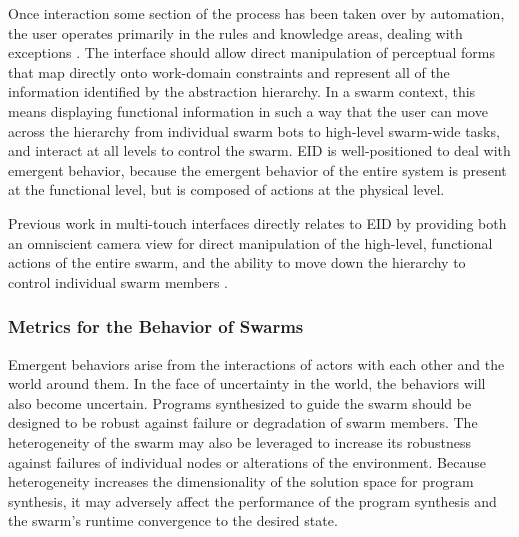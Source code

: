 \documentclass[]{article}
\begin{document}
Once interaction some section of the process has been taken over by automation, the user operates primarily in the rules and knowledge areas, dealing with exceptions \cite{vicente2002ecological}.
The interface should allow direct manipulation of perceptual forms that map directly onto work-domain constraints and represent all of the information identified by the abstraction hierarchy. 
In a swarm context, this means displaying functional information in such a way that the user can move across the hierarchy from individual swarm bots to high-level swarm-wide tasks, and interact at all levels to control the swarm. 
EID is well-positioned to deal with emergent behavior, because the emergent behavior of the entire system is present at the functional level, but is composed of actions at the physical level.  

Previous work in multi-touch interfaces directly relates to EID by providing both an omniscient camera view for direct manipulation of the high-level, functional actions of the entire swarm, and the ability to move down the hierarchy to control individual swarm members \cite{Micire:2009:ANG:1731903.1731912}.


\subsubsection{Metrics for the Behavior of Swarms}

Emergent behaviors arise from the interactions of actors with each other and the world around them. 
In the face of uncertainty in the world, the behaviors will also become uncertain. 
Programs synthesized to guide the swarm should be designed to be robust against failure or degradation of swarm members. 
The heterogeneity of the swarm may also be leveraged to increase its robustness against failures of individual nodes or alterations of the environment. 
Because heterogeneity increases the dimensionality of the solution space for program synthesis, it may adversely affect the performance of the program synthesis and the swarm's runtime convergence to the desired state.
\end{document}
